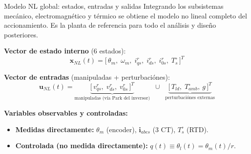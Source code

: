 \documentclass[aspectratio=169,t]{beamer}
\begin{document}
\begin{frame}{Modelo NL global: estados, entradas y salidas}
{\small\color{uncGray}Integrando los subsistemas mecánico, electromagnético y térmico se obtiene el modelo no lineal completo del accionamiento. Es la planta de referencia para todo el análisis y diseño posteriores.}\par
\vspace{4mm}

\textbf{Vector de estado interno} (6 estados):
\begin{equation*}
\bm{x}_{NL}(t) = \big[\,\theta_m,\;\omega_m,\;i_{qs}^{r},\;i_{ds}^{r},\;i_{0s}^{r},\;T_s^\circ\,\big]^T
\end{equation*}

\textbf{Vector de entradas} (manipuladas + perturbaciónes):
\begin{equation*}
\bm{u}_{NL}(t) = \underbrace{\big[\,v_{qs}^{r},\;v_{ds}^{r},\;v_{0s}^{r}\,\big]^T}_{\text{manipuladas (vía Park del inversor)}} \;\;\cup\;\; \underbrace{\big[\,T_{ld},\;T_{amb}^\circ,\ g\,\big]^T}_{\text{perturbaciónes externas}}
\end{equation*}

\textbf{Variables observables y controladas:}
\begin{itemize}\small
\item \textbf{Medidas directamente:} $\theta_m$ (encoder), $\bm{i}_{abcs}$ (3 CT), $T_s^\circ$ (RTD).
\item \textbf{Controlada (no medida directamente):} $q(t)\equiv\theta_l(t) = \theta_m(t)/r$.
\end{itemize}
\end{frame}
\end{document}

